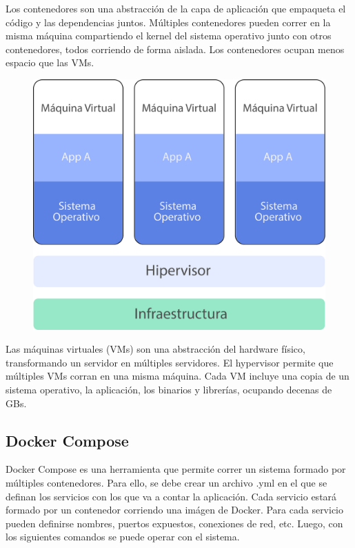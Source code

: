 \break

Los contenedores son una abstracción de la capa de aplicación que empaqueta el código y las dependencias juntos. Múltiples contenedores pueden correr en la misma máquina compartiendo el kernel del sistema operativo junto con otros contenedores, todos corriendo de forma aislada. Los contenedores ocupan menos espacio que las VMs.

\begin{figure}[h!]
  \centering
    \includegraphics[scale=0.7]{images/vms.png}
  \label{fig:vm}
\end{figure}

\break

Las máquinas virtuales (VMs) son una abstracción del hardware físico, transformando un servidor en múltiples servidores. El hypervisor permite que múltiples VMs corran en una misma máquina. Cada VM incluye una copia de un sistema operativo, la aplicación, los binarios y librerías, ocupando decenas de GBs.


\subsection[Docker Compose]{Docker Compose}

Docker Compose es una herramienta que permite correr un sistema formado por múltiples contenedores. Para ello, se debe crear un archivo .yml en el que se definan los servicios con los que va a contar la aplicación. Cada servicio estará formado por un contenedor corriendo una imágen de Docker. 
Para cada servicio pueden definirse nombres, puertos expuestos, conexiones de red, etc. Luego, con los siguientes comandos se puede operar con el sistema.

